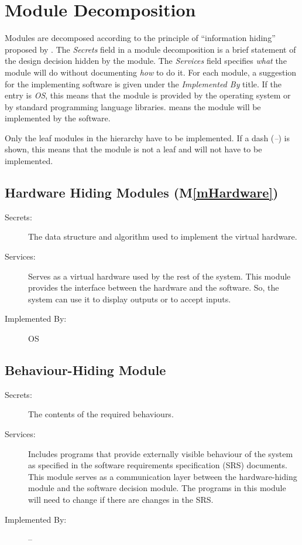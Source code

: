 \documentclass[12pt, titlepage]{article}
\newcommand{\mref}[1]{M\ref{#1}}
\begin{document}
\section{Module Decomposition} \label{SecMD}

Modules are decomposed according to the principle of ``information hiding''
proposed by \citet{ParnasEtAl1984}. The \emph{Secrets} field in a module
decomposition is a brief statement of the design decision hidden by the
module. The \emph{Services} field specifies \emph{what} the module will do
without documenting \emph{how} to do it. For each module, a suggestion for the
implementing software is given under the \emph{Implemented By} title. If the
entry is \emph{OS}, this means that the module is provided by the operating
system or by standard programming language libraries.  \emph{\progname{}} means the
module will be implemented by the \progname{} software.

Only the leaf modules in the hierarchy have to be implemented. If a dash
(\emph{--}) is shown, this means that the module is not a leaf and will not have
to be implemented.

\subsection{Hardware Hiding Modules (\mref{mHardware})}

\begin{description}
\item[Secrets:]The data structure and algorithm used to implement the virtual
  hardware.
\item[Services:]Serves as a virtual hardware used by the rest of the
  system. This module provides the interface between the hardware and the
  software. So, the system can use it to display outputs or to accept inputs.
\item[Implemented By:] OS
\end{description}

\subsection{Behaviour-Hiding Module}

\begin{description}
\item[Secrets:] The contents of the required behaviours.
\item[Services:]Includes programs that provide externally visible behaviour of
  the system as specified in the software requirements specification (SRS)
  documents. This module serves as a communication layer between the
  hardware-hiding module and the software decision module. The programs in this
  module will need to change if there are changes in the SRS.
\item[Implemented By:] --
\end{description}
\end{document}
